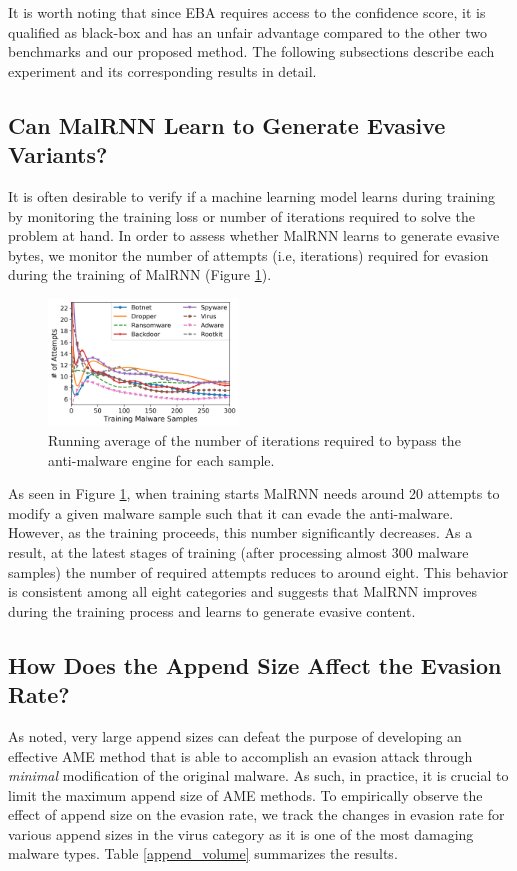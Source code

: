 \documentclass[letterpaper]{article}
\newcommand{\malrnn}{M\lowercase{a}lRNN }
\begin{document}
It is worth noting that since EBA requires access to the confidence score, it is qualified as black-box and has an unfair advantage compared to the other two benchmarks and our proposed method. The following subsections describe each experiment and its corresponding results in detail.

\subsection{Can \malrnn Learn to Generate Evasive Variants?}
 It is often desirable to verify if a machine learning model learns during training by monitoring the training loss or number of iterations required to solve the problem at hand. In order to assess whether \malrnn learns to generate evasive bytes, we monitor the number of attempts (i.e, iterations) required for evasion during the training of \malrnn (Figure \ref{training_iterations}).

 \begin{figure}[h]
        \includegraphics[width=0.45\textwidth]{Training_Iteration_Illustration.png}
        \caption{Running average of the number of iterations required to bypass the anti-malware engine for each sample.}
    \label{training_iterations}
\end{figure}

 As seen in Figure \ref{training_iterations}, when training starts \malrnn needs around 20 attempts to modify a given malware sample such that it can evade the anti-malware. However, as the training proceeds, this number significantly decreases. As a result, at the latest stages of training (after processing almost 300 malware samples) the number of required attempts reduces to around eight. This behavior is consistent among all eight categories and suggests that \malrnn improves during the training process and learns to generate evasive content.

\subsection{How Does the Append Size Affect the Evasion Rate?}
As noted, very large append sizes can defeat the purpose of developing an effective AME method that is able to accomplish an evasion attack through \textit{minimal} modification of the original malware. As such, in practice, it is crucial to limit the maximum append size of AME methods. To empirically observe the effect of append size on the evasion rate, we track the changes in evasion rate for various append sizes in the virus category as it is one of the most damaging malware types. Table \ref{append_volume} summarizes the results.
\end{document}
